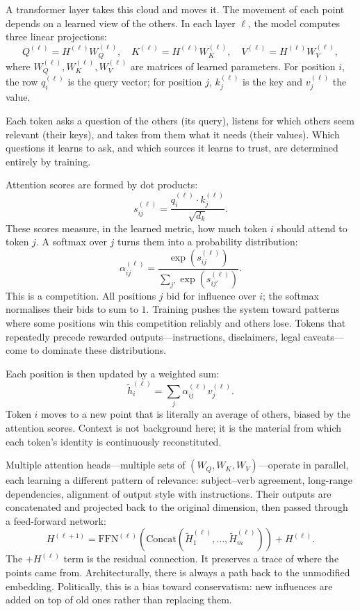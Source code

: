 \documentclass[12pt,a4paper]{article}
\begin{document}
A transformer layer takes this cloud and moves it. The movement of each point depends on a learned view of the others. In each layer $\ell$, the model computes three linear projections:
\[
Q^{(\ell)} = H^{(\ell)} W_Q^{(\ell)}, \quad
K^{(\ell)} = H^{(\ell)} W_K^{(\ell)}, \quad
V^{(\ell)} = H^{(\ell)} W_V^{(\ell)},
\]
where $W_Q^{(\ell)}, W_K^{(\ell)}, W_V^{(\ell)}$ are matrices of learned parameters. For position $i$, the row $q^{(\ell)}_i$ is the query vector; for position $j$, $k^{(\ell)}_j$ is the key and $v^{(\ell)}_j$ the value.

Each token asks a question of the others (its query), listens for which others seem relevant (their keys), and takes from them what it needs (their values). Which questions it learns to ask, and which sources it learns to trust, are determined entirely by training.

Attention scores are formed by dot products:
\[
s^{(\ell)}_{ij} = \frac{q^{(\ell)}_i \cdot k^{(\ell)}_j}{\sqrt{d_k}}.
\]
These scores measure, in the learned metric, how much token $i$ should attend to token $j$. A softmax over $j$ turns them into a probability distribution:
\[
\alpha^{(\ell)}_{ij} = \frac{\exp(s^{(\ell)}_{ij})}{\sum_{j'} \exp(s^{(\ell)}_{ij'})}.
\]
This is a competition. All positions $j$ bid for influence over $i$; the softmax normalises their bids to sum to $1$. Training pushes the system toward patterns where some positions win this competition reliably and others lose. Tokens that repeatedly precede rewarded outputs---instructions, disclaimers, legal caveats---come to dominate these distributions.

Each position is then updated by a weighted sum:
\[
\tilde{h}^{(\ell)}_i = \sum_j \alpha^{(\ell)}_{ij} v^{(\ell)}_j.
\]
Token $i$ moves to a new point that is literally an average of others, biased by the attention scores. Context is not background here; it is the material from which each token's identity is continuously reconstituted.

Multiple attention heads---multiple sets of $(W_Q, W_K, W_V)$---operate in parallel, each learning a different pattern of relevance: subject--verb agreement, long-range dependencies, alignment of output style with instructions. Their outputs are concatenated and projected back to the original dimension, then passed through a feed-forward network:
\[
H^{(\ell+1)} = \mathrm{FFN}^{(\ell)}\!\left(\mathrm{Concat}\!\left(\tilde{H}^{(\ell)}_1,\dots,\tilde{H}^{(\ell)}_m\right)\right) + H^{(\ell)}.
\]
The $+ H^{(\ell)}$ term is the residual connection. It preserves a trace of where the points came from. Architecturally, there is always a path back to the unmodified embedding. Politically, this is a bias toward conservatism: new influences are added on top of old ones rather than replacing them.
\end{document}
